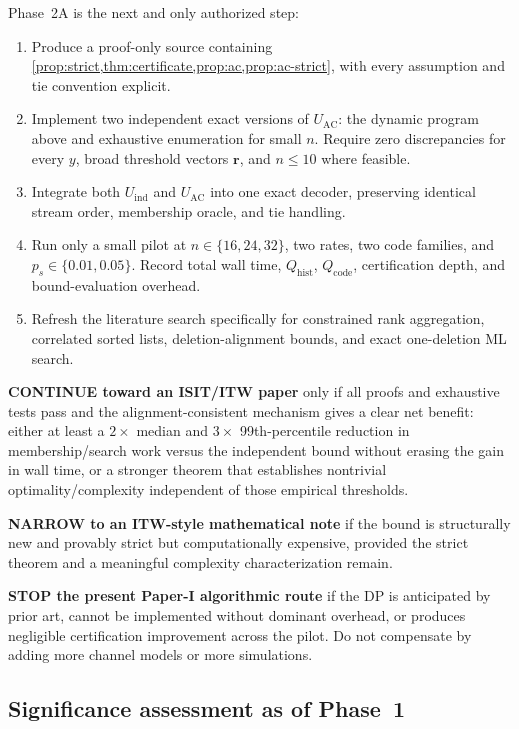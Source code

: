 \documentclass[11pt]{article}
\theoremstyle{definition}
\theoremstyle{remark}
\begin{document}
Phase~2A is the next and only authorized step:
\begin{enumerate}
  \item Produce a proof-only source containing \cref{prop:strict,thm:certificate,prop:ac,prop:ac-strict}, with every assumption and tie convention explicit.
  \item Implement two independent exact versions of $U_{\mathrm{AC}}$: the dynamic program above and exhaustive enumeration for small $n$. Require zero discrepancies for every $y$, broad threshold vectors $\mathbf r$, and $n\le10$ where feasible.
  \item Integrate both $U_{\mathrm{ind}}$ and $U_{\mathrm{AC}}$ into one exact decoder, preserving identical stream order, membership oracle, and tie handling.
  \item Run only a small pilot at $n\in\{16,24,32\}$, two rates, two code families, and $p_s\in\{0.01,0.05\}$. Record total wall time, $Q_{\mathrm{hist}}$, $Q_{\mathrm{code}}$, certification depth, and bound-evaluation overhead.
  \item Refresh the literature search specifically for constrained rank aggregation, correlated sorted lists, deletion-alignment bounds, and exact one-deletion ML search.
\end{enumerate}

\begin{stopbox}
\textbf{CONTINUE toward an ISIT/ITW paper} only if all proofs and exhaustive tests pass and the alignment-consistent mechanism gives a clear net benefit: either at least a $2\times$ median and $3\times$ 99th-percentile reduction in membership/search work versus the independent bound without erasing the gain in wall time, or a stronger theorem that establishes nontrivial optimality/complexity independent of those empirical thresholds.

\textbf{NARROW to an ITW-style mathematical note} if the bound is structurally new and provably strict but computationally expensive, provided the strict theorem and a meaningful complexity characterization remain.

\textbf{STOP the present Paper-I algorithmic route} if the DP is anticipated by prior art, cannot be implemented without dominant overhead, or produces negligible certification improvement across the pilot. Do not compensate by adding more channel models or more simulations.
\end{stopbox}

\subsection{Significance assessment as of Phase~1}
\end{document}
